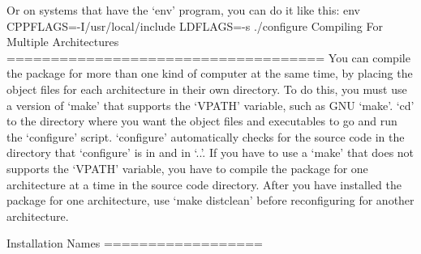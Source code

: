 \begin{DoxyCodeInclude}
Or on systems that have the `env\textcolor{stringliteral}{' program, you can do it like this:}
\textcolor{stringliteral}{     env CPPFLAGS=-I/usr/local/include LDFLAGS=-s ./configure}
\textcolor{stringliteral}{}
\textcolor{stringliteral}{Compiling For Multiple Architectures}
\textcolor{stringliteral}{====================================}
\textcolor{stringliteral}{}
\textcolor{stringliteral}{   You can compile the package for more than one kind of computer at the}
\textcolor{stringliteral}{same time, by placing the object files for each architecture in their}
\textcolor{stringliteral}{own directory.  To do this, you must use a version of `make'} that
supports the `VPATH\textcolor{stringliteral}{' variable, such as GNU `make'}.  `cd\textcolor{stringliteral}{' to the}
\textcolor{stringliteral}{directory where you want the object files and executables to go and run}
\textcolor{stringliteral}{the `configure'} script.  `configure\textcolor{stringliteral}{' automatically checks for the}
\textcolor{stringliteral}{source code in the directory that `configure'} is in and in `..\textcolor{stringliteral}{'.}
\textcolor{stringliteral}{}
\textcolor{stringliteral}{   If you have to use a `make'} that does not supports the `VPATH\textcolor{stringliteral}{'}
\textcolor{stringliteral}{variable, you have to compile the package for one architecture at a time}
\textcolor{stringliteral}{in the source code directory.  After you have installed the package for}
\textcolor{stringliteral}{one architecture, use `make distclean'} before reconfiguring \textcolor{keywordflow}{for} another
architecture.

Installation Names
==================


\end{DoxyCodeInclude}
